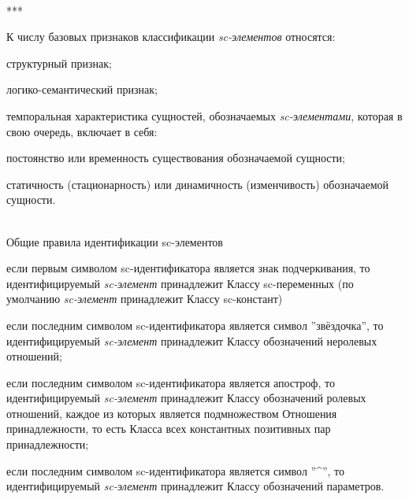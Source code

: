 \begin{frame}{\\***}
	\begin{SCn}
		К числу базовых признаков классификации \textit{sc-элементов} относятся:
		\begin{textitemize}
			\item структурный признак;
			\item логико-семантический признак;
			\item темпоральная характеристика сущностей, обозначаемых \textit{sc-элементами}, которая в свою очередь, включает в себя:
			\begin{textitemize}
				\item постоянство или временность существования обозначаемой сущности;
				\item статичность (стационарность) или динамичность (изменчивость) обозначаемой сущности.
			\end{textitemize}
		\end{textitemize}
	\end{SCn}
\end{frame}

\begin{frame}{\\Общие правила идентификации sc-элементов}
	\vspace{10mm}
	\begin{SCn}
			\begin{textitemize}
				\item если первым символом sc-идентификатора является знак подчеркивания, то идентифицируемый \textit{sc-элемент} принадлежит Классу sc-переменных (по умолчанию \textit{sc-элемент} принадлежит Классу sc-констант)
				\item если последним символом sc-идентификатора является символ ''звёздочка'', то идентифицируемый \textit{sc-элемент} принадлежит Классу обозначений неролевых отношений;
				\item если последним символом sc-идентификатора является апостроф, то идентифицируемый \textit{sc-элемент} принадлежит Классу обозначений ролевых отношений, каждое из которых является подмножеством Отношения принадлежности, то есть Класса всех константных позитивных пар принадлежности;
				\item если последним символом sc-идентификатора является символ ''\textasciicircum'', то идентифицируемый \textit{sc-элемент} принадлежит Классу обозначений параметров.
			\end{textitemize}
	\end{SCn}
\end{frame}

